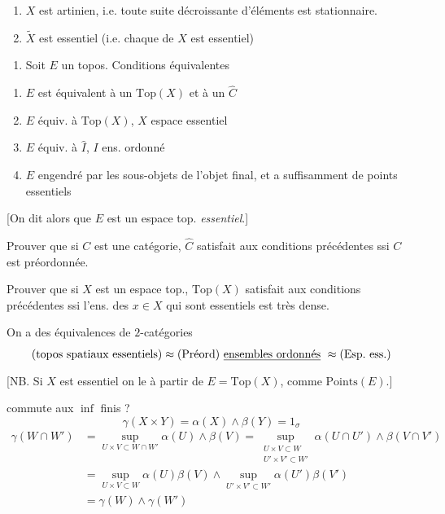 \documentclass[11pt,a4paper]{article}
\begin{document}
\begin{enumerate}
\item[$\gamma$)]  $X$ est 
artinien, i.e. toute  suite décroissante d'éléments est
stationnaire.
\item[$\delta$)] $\widetilde{X}$ est essentiel (i.e. chaque
 de $X$ est essentiel)
\end{enumerate}

\begin{enumerate}
\item[j)] Soit $E$ un topos. Conditions équivalentes
\end{enumerate}

\begin{enumerate}
\item[$\alpha$)] $E$  est équivalent à un $\mathrm{Top}(X)$ et à un
$\widehat{C}$
\item[$\beta$)] $E$ équiv. à $\mathrm{Top}(X)$, $X$ espace essentiel
\item[$\gamma$)] $E$ équiv. à $\widehat{I}$, $I$ ens. ordonné
\item[$\delta$)] $E$ engendré par les sous-objets de l'objet final, et a
suffisamment de points essentiels
\end{enumerate}

[On dit alors que $E$ est un espace top. \emph{essentiel}.]

Prouver que si $C$ est une catégorie, $\widehat{C}$ satisfait aux conditions
précédentes ssi $C$ est préordonnée.

Prouver que si $X$ est un espace top., $\mathrm{Top}(X)$ satisfait aux conditions
précédentes ssi l'ens. des $x \in X$ qui sont essentiels est très dense.

\struck{\ill{}} On a des équivalences de $2$-catégories
\[
(\text{topos spatiaux essentiels}) \approx (\text{Préord})
\ \struck{\text{ensembles ordonn\'es}}\ \approx (\mathrm{Esp.\ ess.})
\]
[NB. Si $X$ est essentiel on le \ill{} à partir de $E = \mathrm{Top}(X)$, comme
\ill{} $\mathrm{Points}(E)$.]

\struck{$\gamma$} commute aux $\inf$ finis ?
\[
\gamma(X \times Y) = \alpha(X) \wedge \beta(Y) = 1_{\sigma}
\]
\begin{align*}
\gamma(W \cap W') &= \sup_{U \times V \subset W \cap W'} \alpha(U) \wedge \beta(V)
= \sup_{\substack{U \times V \subset W \\ U' \times V' \subset W'}}
\alpha(U \cap U') \wedge \beta(V \cap V') \\
&= \sup_{U \times V \subset W} \alpha(U)\beta(V) \wedge
\sup_{U' \times V' \subset W'} \alpha(U')\beta(V') \\
&= \gamma(W) \wedge \gamma(W')
\end{align*}
\end{document}
